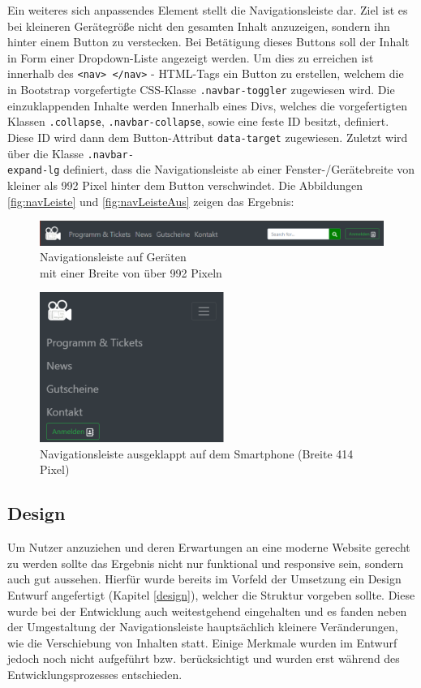 	Ein weiteres sich anpassendes Element stellt die Navigationsleiste dar. Ziel ist es bei kleineren Gerätegröße nicht den gesamten Inhalt anzuzeigen, sondern ihn hinter einem Button zu verstecken. Bei Betätigung dieses Buttons soll der Inhalt in Form einer Dropdown-Liste angezeigt werden. Um dies zu erreichen ist innerhalb des \texttt{<nav> </nav>} - \ac{HTML}-Tags ein Button zu erstellen, welchem die in Bootstrap vorgefertigte CSS-Klasse \texttt{.navbar-toggler} zugewiesen wird. Die einzuklappenden Inhalte werden Innerhalb eines Divs, welches die vorgefertigten Klassen \texttt{.collapse}, \texttt{.navbar-collapse}, sowie eine feste ID besitzt, definiert. Diese ID wird dann dem Button-Attribut \texttt{data-target} zugewiesen. Zuletzt wird über die Klasse \texttt{.navbar-\\expand-lg} definiert, dass die Navigationsleiste ab einer Fenster-/Gerätebreite von kleiner als 992 Pixel hinter dem Button verschwindet. Die Abbildungen \vref{fig:navLeiste} und \vref{fig:navLeisteAus} zeigen das Ergebnis:
	\begin{figure}[H]
		\centering 
		\includegraphics[width=13cm]{img/navLeiste.png}
		\captionsetup{format=hang}
		\caption[Navigationsleiste]{\label{fig:navLeiste} Navigationsleiste auf Geräten\\ mit einer Breite von über 992 Pixeln}
	\end{figure}
	
	\begin{figure}[H]
		\centering 
		\includegraphics[width=6cm]{img/navLeisteAus.png}
		\captionsetup{format=hang}
		\caption[Navigationsleiste ausgeklappt]{\label{fig:navLeisteAus} Navigationsleiste ausgeklappt auf dem Smartphone (Breite 414 Pixel)}
	\end{figure}

	\subsection{Design}
	Um Nutzer anzuziehen und deren Erwartungen an eine moderne Website gerecht zu werden sollte das Ergebnis nicht nur funktional und responsive sein, sondern auch gut aussehen. Hierfür wurde bereits im Vorfeld der Umsetzung ein Design Entwurf angefertigt (Kapitel \vref{design}), welcher die Struktur vorgeben sollte. Diese wurde bei der Entwicklung auch weitestgehend eingehalten und es fanden neben der Umgestaltung der Navigationsleiste hauptsächlich kleinere Veränderungen, wie die Verschiebung von Inhalten statt. Einige Merkmale wurden im Entwurf jedoch noch nicht aufgeführt bzw. berücksichtigt und wurden erst während des Entwicklungsprozesses entschieden. 
	
